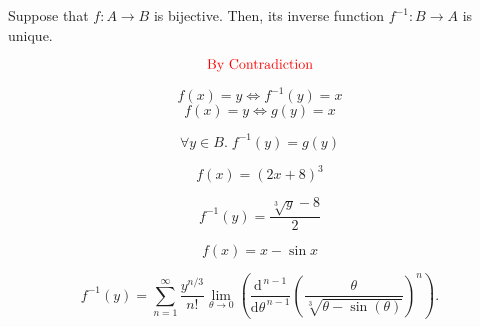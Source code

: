 %
%
%

\begin{frame}{}
  \begin{theorem}
    Suppose that $f: A \to B$ is bijective.
    Then, its inverse function $f^{-1}: B \to A$ is unique.
  \end{theorem}

  \pause
  \[
    \text{\textcolor{red}{By Contradiction}}
  \]

  \pause
  \[
    f(x) = y \iff f^{-1}(y) = x
  \]
  \[
    f(x) = y \iff g(y) = x
  \]

  \pause
  \[
    \forall y \in B.\; f^{-1}(y) = g(y)
  \]
\end{frame}

\begin{frame}{}
  \[
    f(x) = (2x + 8)^{3}
  \]

  \pause
  \[
    f^{-1}(y) = \frac{\sqrt[3]{y} - 8}{2}
  \]

  \pause
  \vspace{0.50cm}
  \[
    f(x) = x - \sin x
  \]

  \pause
  \[
    f^{-1}(y) = \sum_{n=1}^\infty
      \frac{y^{n/3}}{n!} \lim_{ \theta \to 0}
      \left(\frac{\mathrm{d}^{\,n-1}}{\mathrm{d} \theta^{\,n-1}}
        \left(\frac \theta { \sqrt[3]{ \theta - \sin( \theta )} } \right)^n
      \right).
  \]
\end{frame}

